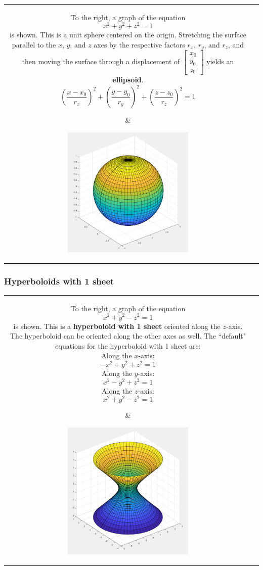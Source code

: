\documentclass{article}
\begin{document}
\begin{tabular}{cc}
\parbox{0.5\textwidth}{
To the right, a graph of the equation 
\[x^2 + y^2 + z^2 = 1\]
is shown. This is a unit sphere centered on the origin. Stretching the surface parallel to the \(x\), \(y\), and \(z\) axes by the respective factors \(r_x\), \(r_y\), and \(r_z\), and then moving the surface through a displacement of \(\begin{bmatrix} x_0 \\ y_0 \\ z_0 \end{bmatrix}\) yields an {\bf ellipsoid}.
\[\left(\frac{x - x_0}{r_x}\right)^2 + \left(\frac{y - y_0}{r_y}\right)^2 + \left(\frac{z - z_0}{r_z}\right)^2 = 1\]    
} & \parbox{0.5\textwidth}{
\includegraphics[width = 0.5\textwidth]{ellipsoid.png}
}
\end{tabular}

\subsubsection*{Hyperboloids with 1 sheet} 

\begin{tabular}{cc}
\parbox{0.5\textwidth}{
To the right, a graph of the equation 
\[x^2 + y^2 - z^2 = 1\]
is shown. This is a {\bf hyperboloid with 1 sheet} oriented along the \(z\)-axis. The hyperboloid can be oriented along the other axes as well. The ``default" equations for the hyperboloid with 1 sheet are: \\
Along the \(x\)-axis:
\[-x^2 + y^2 + z^2 = 1\]
Along the \(y\)-axis:
\[x^2 - y^2 + z^2 = 1\]
Along the \(z\)-axis:
\[x^2 + y^2 - z^2 = 1\]
} & \parbox{0.5\textwidth}{
\includegraphics[width = 0.5\textwidth]{1_sheet_hyperboloid.png}
}
\end{tabular}
\end{document}
